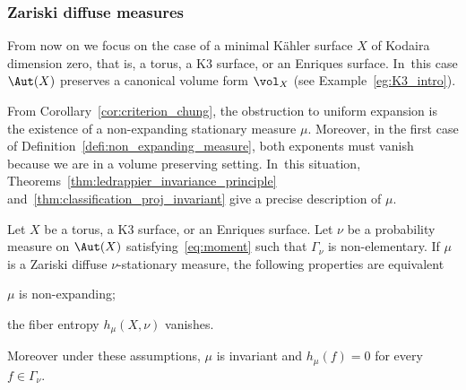 \subsubsection{Zariski diffuse measures}
From now on we focus on the case of a minimal Kähler surface
$X$ of Kodaira dimension zero, that is,
a torus, a K3 surface, or an Enriques surface. In~this case
$\Aut(X)$ preserves a canonical volume form $\vol_X$ (see Example~\ref{eg:K3_intro}).\enlargethispage{\baselineskip}%

From Corollary~\ref{cor:criterion_chung}, the obstruction
to uniform expansion is the existence of a non-expanding stationary measure $\mu$. Moreover, in the first case of Definition~\ref{defi:non_expanding_measure}, both
exponents must vanish because we are in a volume preserving setting. In~this situation,
Theorems~\ref{thm:ledrappier_invariance_principle}
and~\ref{thm:classification_proj_invariant} give a precise description of $\mu$.

\begin{thm}\label{thm:rigidity}
Let $X$ be a torus, a K3 surface, or an Enriques surface. Let $\nu$ be a probability measure on
$\Aut(X)$ satisfying~\eqref{eq:moment} such that $\Gamma_\nu$ is non-elementary.
If $\mu$ is a Zariski diffuse $\nu$-stationary measure, the following properties are equivalent
\begin{enumeratea}
\item\label{thm:rigiditya}
$\mu$ is non-expanding;
\item\label{thm:rigidityb}
the fiber entropy $h_\mu(X, \nu)$ vanishes.
\end{enumeratea}
Moreover under these assumptions, $\mu$ is invariant and $h_\mu(f)=0$ for every $f\in \Gamma_\nu$.
\end{thm}


